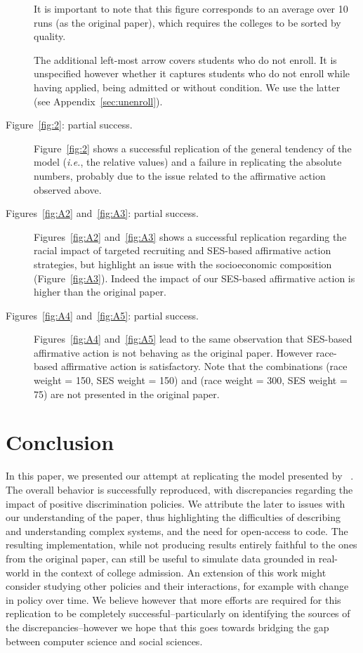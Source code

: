 \begin{description}
It is important to note that this figure corresponds to an average over 10 runs (as the original paper), which requires the colleges to be sorted by quality. 

The additional left-most arrow covers students who do not enroll. It is unspecified however whether it captures students who do not enroll while having applied, being admitted or without condition. We use the latter (see Appendix~\ref{sec:unenroll}).

\item[Figure~\ref{fig:2}: partial success.]  Figure~\ref{fig:2} shows a successful replication of the general tendency of the model (\emph{i.e.}, the relative values) and a failure in replicating the absolute numbers, probably due to the issue related to the affirmative action observed above.

\item[Figures~\ref{fig:A2} and~\ref{fig:A3}: partial success.] Figures~\ref{fig:A2} and~\ref{fig:A3} shows a successful replication regarding the racial impact of targeted recruiting and SES-based affirmative action strategies, but highlight an issue with the socioeconomic composition (Figure~\ref{fig:A3}). Indeed the impact of our SES-based affirmative action is higher than the original paper.

\item[Figures~\ref{fig:A4} and~\ref{fig:A5}: partial success.] Figures~\ref{fig:A4} and~\ref{fig:A5} lead to the same observation that SES-based affirmative action is not behaving as the original paper. However race-based affirmative action is satisfactory. Note that the combinations (race weight = 150, SES weight = 150) and (race weight = 300, SES weight = 75) are not presented in the original paper.

\end{description}

\section{Conclusion}

In this paper, we presented our attempt at replicating the model presented by \citeauthor{reardon2018levels}~\cite{reardon2018levels}.
The overall behavior is successfully reproduced, with discrepancies regarding the impact of positive discrimination policies.
We attribute the later to issues with our understanding of the paper, thus highlighting the difficulties of describing and understanding complex systems, and the need for open-access to code.
The resulting implementation, while not producing results entirely faithful to the ones from the original paper, can still be useful to simulate data grounded in real-world in the context of college admission.
An extension of this work might consider studying other policies and their interactions, for example with change in policy over time.
We believe however that more efforts are required for this replication to be completely successful--particularly on identifying the sources of the discrepancies--however we hope that this goes towards bridging the gap between computer science and social sciences.

